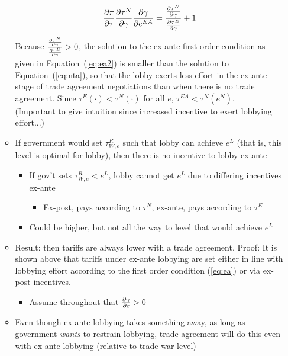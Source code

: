 \begin{itemize}
\begin{itemize}
				  \begin{equation}
					  \frac{\partial \pi}{\partial \tau} \frac{\partial \tau^N}{\partial \gamma} \frac{\partial \gamma}{\partial e^{EA}} = \frac{\frac{\partial \tau^N}{\partial \gamma}}{\frac{\partial \tau^E}{\partial \gamma}} + 1
						\label{eq:ea2}
					\end{equation}
				Because $\frac{\frac{\partial \tau^N}{\partial \gamma}}{\frac{\partial \tau^E}{\partial \gamma}} > 0$, the solution to the ex-ante first order condition as given in Equation~(\ref{eq:ea2}) is smaller than the solution to Equation~(\ref{eq:nta}), so that the lobby exerts less effort in the ex-ante stage of trade agreement negotiations than when there is no trade agreement. Since $\tau^E(\cdot) < \tau^N(\cdot)$ for all $e$, $\tau^{EA} < \tau^N(e^N)$. \\
			(Important to give intuition since increased incentive to exert lobbying effort...)
				\item If government would set $\tau^R_{W,e}$ such that lobby can achieve $e^L$ (that is, this level is optimal for lobby), then there is no incentive to lobby ex-ante
		\begin{itemize}
			\item If gov't sets $\tau^R_{W,e} < e^L$, lobby cannot get $e^L$ due to differing incentives ex-ante 
						\begin{itemize}
							\item Ex-post, pays according to $\tau^N$, ex-ante, pays according to $\tau^E$
						\end{itemize}
					\item Could be higher, but not all the way to level that would achieve $e^L$
				\end{itemize}
			\item Result: then tariffs are always lower with a trade agreement.
			Proof: It is shown above that tariffs under ex-ante lobbying are set either in line with lobbying effort according to the first order condition (\ref{eq:ea}) or via ex-post incentives. 
				\begin{itemize}
					\item Assume throughout that $\frac{\partial \gamma}{\partial e} > 0$
				\end{itemize}
			\item Even though ex-ante lobbying takes something away, as long as government \textit{wants} to restrain lobbying, trade agreement will do this even with ex-ante lobbying (relative to trade war level)
				\begin{itemize}

\end{itemize}
\end{itemize}
\end{itemize}
